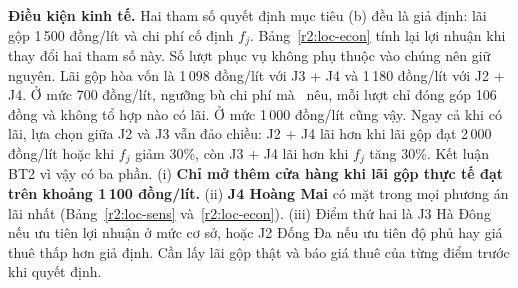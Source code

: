 {
\textbf{Điều kiện kinh tế.} Hai tham số quyết định mục tiêu (b) đều là giả định:
lãi gộp 1\,500 đồng/lít và chi phí cố định $f_j$. Bảng~\ref{r2:loc-econ} tính
lại lợi nhuận khi thay đổi hai tham số này. Số lượt phục vụ không phụ thuộc vào
chúng nên giữ nguyên. Lãi gộp hòa vốn là 1\,098 đồng/lít với J3 + J4 và 1\,180
đồng/lít với J2 + J4. Ở mức 700 đồng/lít, ngưỡng bù chi phí mà~\cite{chietkhau}
nêu, mỗi lượt chỉ đóng góp 106 đồng và không tổ hợp nào có lãi. Ở mức 1\,000
đồng/lít cũng vậy. Ngay cả khi có lãi, lựa chọn giữa J2 và J3 vẫn đảo chiều:
J2 + J4 lãi hơn khi lãi gộp đạt 2\,000 đồng/lít hoặc khi $f_j$ giảm 30\%,
còn J3 + J4 lãi hơn khi $f_j$ tăng 30\%. Kết luận BT2 vì vậy có ba phần.
(i) \textbf{Chỉ mở thêm cửa hàng khi lãi gộp thực tế đạt trên khoảng 1\,100
đồng/lít.} (ii) \textbf{J4 Hoàng Mai} có mặt trong mọi phương án lãi nhất (Bảng~\ref{r2:loc-sens} và~\ref{r2:loc-econ}).
(iii) Điểm thứ hai là J3 Hà Đông nếu ưu tiên lợi nhuận ở mức cơ sở, hoặc J2
Đống Đa nếu ưu tiên độ phủ hay giá thuê thấp hơn giả định. Cần lấy lãi gộp
thật và báo giá thuê của từng điểm trước khi quyết định.

}
